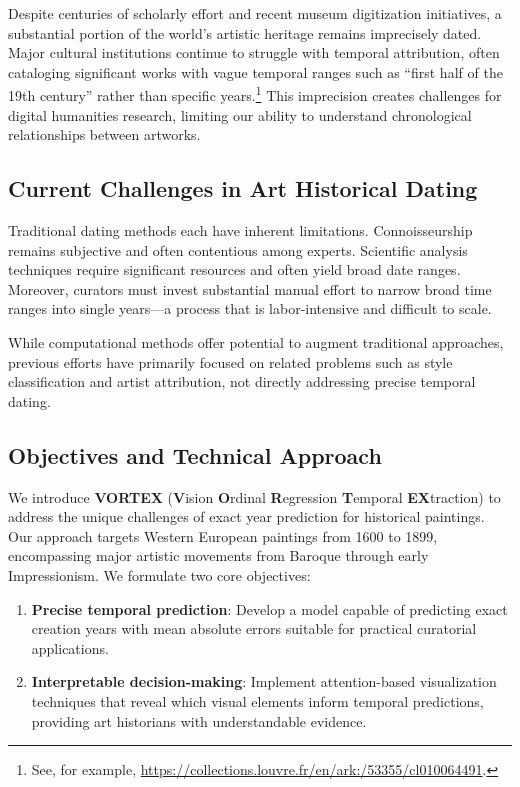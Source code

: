 \documentclass[10pt,twocolumn,letterpaper]{article}
\begin{document}
Despite centuries of scholarly effort and recent museum digitization initiatives, a substantial portion of the world's artistic heritage remains imprecisely dated. Major cultural institutions continue to struggle with temporal attribution, often cataloging significant works with vague temporal ranges such as ``first half of the 19th century'' rather than specific years.\footnote{See, for example, \url{https://collections.louvre.fr/en/ark:/53355/cl010064491}.} This imprecision creates challenges for digital humanities research, limiting our ability to understand chronological relationships between artworks.

\subsection{Current Challenges in Art Historical Dating}

Traditional dating methods each have inherent limitations. Connoisseurship remains subjective and often contentious among experts. Scientific analysis techniques require significant resources and often yield broad date ranges. Moreover, curators must invest substantial manual effort to narrow broad time ranges into single years—a process that is labor-intensive and difficult to scale.

While computational methods offer potential to augment traditional approaches, previous efforts have primarily focused on related problems such as style classification and artist attribution, not directly addressing precise temporal dating.

\subsection{Objectives and Technical Approach}

We introduce \textbf{VORTEX} (\textbf{V}ision \textbf{O}rdinal \textbf{R}egression \textbf{T}emporal \textbf{EX}traction) to address the unique challenges of exact year prediction for historical paintings. Our approach targets Western European paintings from 1600 to 1899, encompassing major artistic movements from Baroque through early Impressionism. We formulate two core objectives:

\begin{enumerate}[leftmargin=1.2em,label=(\arabic*)]
    \item \textbf{Precise temporal prediction}: Develop a model capable of predicting exact creation years with mean absolute errors suitable for practical curatorial applications.

    \item \textbf{Interpretable decision-making}: Implement attention-based visualization techniques that reveal which visual elements inform temporal predictions, providing art historians with understandable evidence.
\end{enumerate}
\end{document}
